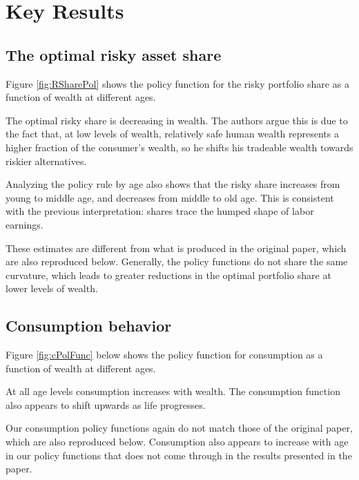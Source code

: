 \documentclass[./CGMPortfolio.tex]{subfiles}
\begin{document}
\hypertarget{Key-Results}{}
\section{Key Results}

\subsection{The optimal risky asset share}

Figure \ref{fig:RSharePol} shows the policy function for the risky portfolio share as a function of wealth at different ages.

The optimal risky share is decreasing in wealth. The authors argue this is due to the fact that, at low levels of wealth, relatively safe human wealth represents a higher fraction of the consumer's wealth, so he shifts his tradeable wealth towards riskier alternatives.

Analyzing the policy rule by age also shows that the risky share increases from young to middle age, and decreases from middle to old age. This is consistent with the previous interpretation: shares trace the humped shape of labor earnings.

These estimates are different from what is produced in the original paper, which are also reproduced below. Generally, the policy functions do not share the same curvature, which leads to greater reductions in the optimal portfolio share at lower levels of wealth.

\providecommand{\figName}{Risky-Share-Policy-Function} %
\providecommand{\figFile}{RShare_Pol} %
\hypertarget{\figFile}{}
\hypertarget{\figName}{}

\subsection{Consumption behavior}

Figure \ref{fig:cPolFunc} below shows the policy function for consumption as a function of wealth at different ages.

At all age levels consumption increases with wealth. The consumption function also appears to shift upwards as life progresses.

Our consumption policy functions again do not match those of the original paper, which are also reproduced below. Consumption also appears to increase with age in our policy functions that does not come through in the results presented in the paper. 
\end{document}
